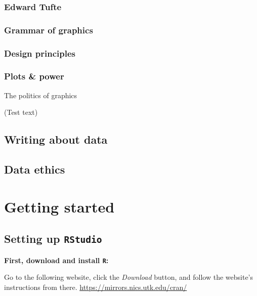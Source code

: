 \documentclass[
]{book}
\begin{document}
\hypertarget{edward-tufte}{%
\section{Edward Tufte}\label{edward-tufte}}

\hypertarget{grammar-of-graphics}{%
\section{Grammar of graphics}\label{grammar-of-graphics}}

\hypertarget{design-principles}{%
\section{Design principles}\label{design-principles}}

\hypertarget{plots-power}{%
\section{Plots \& power}\label{plots-power}}

The politics of graphics

(Test text)

\hypertarget{writing-about-data}{%
\chapter{Writing about data}\label{writing-about-data}}

\hypertarget{data-ethics}{%
\chapter{Data ethics}\label{data-ethics}}

\hypertarget{part-getting-started}{%
\part{Getting started}\label{part-getting-started}}

\hypertarget{setting-up-rstudio}{%
\chapter{\texorpdfstring{Setting up \texttt{RStudio}}{Setting up RStudio}}\label{setting-up-rstudio}}

\textbf{First, download and install \texttt{R}: }

Go to the following website, click the \emph{Download} button, and follow the website's instructions from there.
\url{https://mirrors.nics.utk.edu/cran/}
\end{document}
